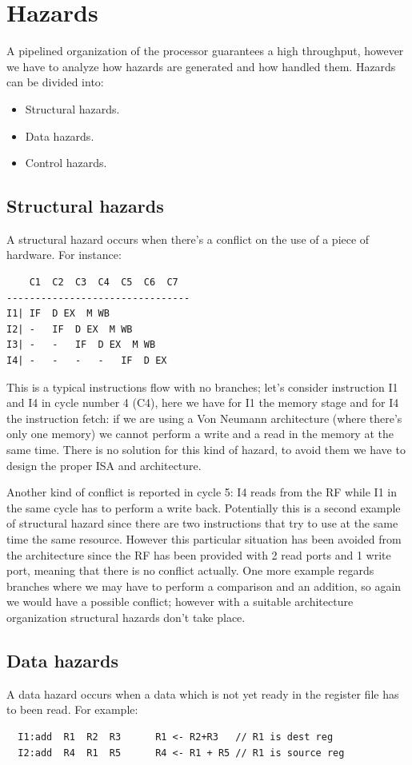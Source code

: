 \section{Hazards}
A pipelined organization of the processor guarantees a high throughput, however we have to analyze how hazards are generated and how handled them. Hazards can be divided into:
\begin{itemize}
  \item Structural hazards.
  \item Data hazards.
  \item Control hazards.
\end{itemize}

\subsection{Structural hazards}
A structural hazard occurs when there's a conflict on the use of a piece of hardware. For instance:

\begin{verbatim}
    C1  C2  C3  C4  C5  C6  C7
--------------------------------
I1| IF  D EX  M WB
I2| -   IF  D EX  M WB
I3| -   -   IF  D EX  M WB
I4| -   -   -   -   IF  D EX
\end{verbatim}

This is a typical instructions flow with no branches; let's consider instruction I1 and I4 in cycle number 4 (C4), here we have for I1 the memory stage and for I4 the instruction fetch: if we are using a Von Neumann architecture (where there's only one memory) we cannot perform a write and a read in the memory at the same time. There is no solution for this kind of hazard, to avoid them we have to design the proper ISA and architecture.

Another kind of conflict is reported in cycle 5: I4 reads from the RF while I1 in the same cycle has to perform a write back. Potentially this is a second example of structural hazard since there are two instructions that try to use at the same time the same resource. However this particular situation has been avoided from the architecture since the RF has been provided with 2 read ports and 1 write port, meaning that there is no conflict actually.
One more example regards branches where we may have to perform a comparison and an addition, so again we would have a possible conflict; however with a suitable architecture organization structural hazards don't take place.

\subsection{Data hazards}
A data hazard occurs when a data which is not yet ready in the register file has to been read. For example:
\begin{verbatim}
  I1:add  R1  R2  R3      R1 <- R2+R3   // R1 is dest reg
  I2:add  R4  R1  R5      R4 <- R1 + R5 // R1 is source reg
\end{verbatim}

